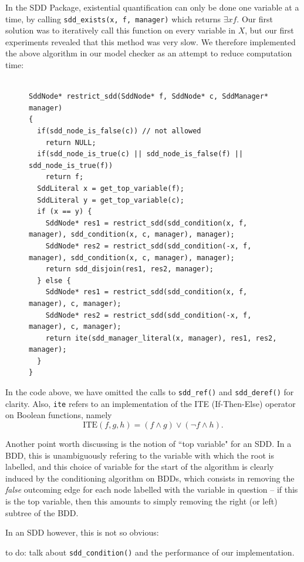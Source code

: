 \documentclass[11pt]{report}
\begin{document}
In the SDD Package, existential quantification can only be done one variable at a time, by calling \texttt{sdd\_exists(x, f, manager)} which returns $\exists x f$. Our first solution was to iteratively call this function on every variable in $X$, but our first experiments revealed that this method was very slow. We therefore implemented the above algorithm in our model checker as an attempt to reduce computation time:
\begin{figure}

\begin{lstlisting}[mathescape]

SddNode* restrict_sdd(SddNode* f, SddNode* c, SddManager* manager) 
{
  if(sdd_node_is_false(c)) // not allowed
    return NULL; 
  if(sdd_node_is_true(c) || sdd_node_is_false(f) || sdd_node_is_true(f))
    return f;
  SddLiteral x = get_top_variable(f);
  SddLiteral y = get_top_variable(c);
  if (x == y) {
    SddNode* res1 = restrict_sdd(sdd_condition(x, f, manager), sdd_condition(x, c, manager), manager);
    SddNode* res2 = restrict_sdd(sdd_condition(-x, f, manager), sdd_condition(x, c, manager), manager);
    return sdd_disjoin(res1, res2, manager);
  } else {
    SddNode* res1 = restrict_sdd(sdd_condition(x, f, manager), c, manager);
    SddNode* res2 = restrict_sdd(sdd_condition(-x, f, manager), c, manager);
    return ite(sdd_manager_literal(x, manager), res1, res2, manager);
  }
}

\end{lstlisting}
\caption*{}
\end{figure}
In the code above, we have omitted the calls to \texttt{sdd\_ref()} and \texttt{sdd\_deref()} for clarity. Also, \texttt{ite} refers to an implementation of the ITE (If-Then-Else) operator on Boolean functions, namely $$\mbox{ITE}(f, g, h) = (f \land g) \lor (\lnot f \land h).$$

Another point worth discussing is the notion of ``top variable" for an SDD. In a BDD, this is unambiguously refering to the variable with which the root is labelled, and this choice of variable for the start of the algorithm is clearly induced by the conditioning algorithm on BDDs, which consists in removing the \textit{false} outcoming edge for each node labelled with the variable in question -- if this is the top variable, then this amounts to simply removing the right (or left) subtree of the BDD. 

In an SDD however, this is not so obvious: 

to do: talk about \texttt{sdd\_condition()} and the performance of our implementation.
\end{document}
